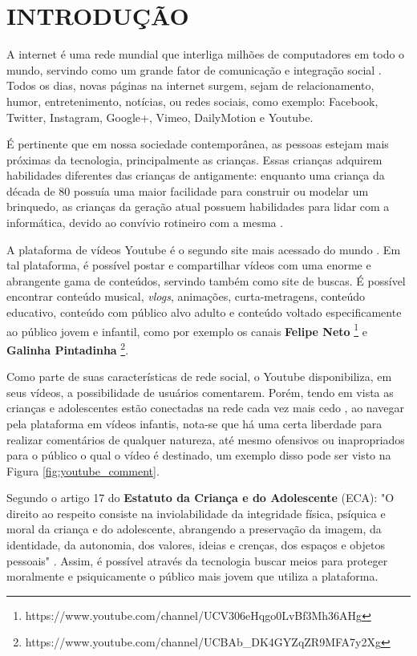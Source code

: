 \newpage
\section{INTRODUÇÃO}


A internet é uma rede mundial que interliga milhões de computadores em todo o mundo, servindo como um grande fator de comunicação e integração social \cite{marioFalcao2015}. Todos os dias, novas páginas na internet surgem, sejam de relacionamento, humor, entretenimento, notícias, ou redes sociais, como exemplo: Facebook, Twitter, Instagram, Google+, Vimeo, DailyMotion e Youtube.

É pertinente que em nossa sociedade contemporânea, as pessoas estejam mais próximas da tecnologia, principalmente as crianças. 
Essas crianças adquirem habilidades diferentes das crianças de antigamente: enquanto uma criança da década de 80 possuía uma maior facilidade para construir ou modelar um brinquedo, as crianças da geração atual possuem habilidades para lidar com a informática, devido ao convívio rotineiro com a mesma \cite{marioFalcao2016}.

A plataforma de vídeos Youtube é o segundo site mais acessado do mundo \cite{alexaYoutube}. Em tal plataforma, é possível postar e compartilhar vídeos com uma enorme e abrangente gama de conteúdos, servindo também como site de buscas. É possível encontrar conteúdo musical, \textit{vlogs}, animações, curta-metragens, conteúdo educativo, conteúdo com público alvo adulto e conteúdo voltado especificamente ao público jovem e infantil, como por exemplo os canais \textbf{Felipe Neto} \footnote{https://www.youtube.com/channel/UCV306eHqgo0LvBf3Mh36AHg} e \textbf{Galinha Pintadinha} \footnote{https://www.youtube.com/channel/UCBAb\_DK4GYZqZR9MFA7y2Xg}.

Como parte de suas características de rede social, o Youtube disponibiliza, em seus vídeos, a possibilidade de usuários comentarem. Porém, tendo em vista as crianças e adolescentes estão conectadas na rede cada vez mais cedo \cite{EnyoGoncalves2017}, ao navegar pela plataforma em vídeos infantis, nota-se que há uma certa liberdade para realizar comentários de qualquer natureza, até mesmo ofensivos ou inapropriados para o público o qual o vídeo é destinado, um exemplo disso pode ser visto na Figura \ref{fig:youtube_comment}.

Segundo o artigo 17 do \textbf{Estatuto da Criança e do Adolescente} (ECA): "O direito ao respeito consiste na inviolabilidade da integridade física, psíquica e moral da criança e do adolescente, abrangendo a preservação da imagem, da identidade, da autonomia, dos valores, ideias e crenças, dos espaços e objetos pessoais" \cite{eca_lei}.  Assim, é possível através da tecnologia buscar meios para proteger moralmente e psiquicamente o público mais jovem que utiliza a plataforma. 

